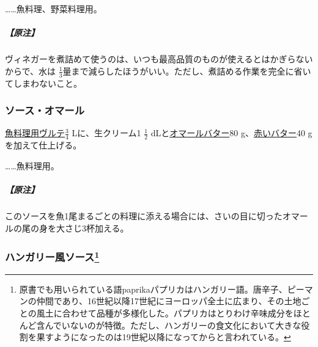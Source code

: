 \begin{recette}
\ldots{}\ldots{}魚料理、野菜料理用。

\hypertarget{nota-sauce-hollandaise}{%
\subparagraph{【原注】}\label{nota-sauce-hollandaise}}

ヴィネガーを煮詰めて使うのは、いつも最高品質のものが使えるとはかぎらないからで、水は
\(\frac{1}{3}\)量まで減らしたほうがいい。ただし、煮詰める作業を完全に省いてしまわないこと。

\atoaki{}

\hypertarget{sauce-homard}{%
\subsubsection{ソース・オマール}\label{sauce-homard}}


 

\protect\hyperlink{veloute-de-poisson}{魚料理用ヴルテ}\(\frac{3}{4}\)
Lに、生クリーム1 \(\frac{1}{2}\)
dLと\protect\hyperlink{beurre-de-homard}{オマールバター}80
g、\protect\hyperlink{beurre-colorant-rouge}{赤いバター}40
gを加えて仕上げる。

\ldots{}\ldots{}魚料理用。

\hypertarget{nota-sauce-homard}{%
\subparagraph{【原注】}\label{nota-sauce-homard}}

このソースを魚1尾まるごとの料理に添える場合には、さいの目に切ったオマールの尾の身を大さじ3杯加える。

\atoaki{}

\hypertarget{sauce-hongroise}{%
\subsubsection[ハンガリー風ソース]{\texorpdfstring{ハンガリー風ソース\footnote{原書でも用いられている語paprikaパプリカはハンガリー語。唐辛子、ピーマンの仲間であり、16世紀以降17世紀にヨーロッパ全土に広まり、その土地ごとの風土に合わせて品種が多様化した。パプリカはとりわけ辛味成分をほとんど含んでいないのが特徴。ただし、ハンガリーの食文化において大きな役割を果すようになったのは19世紀以降になってからと言われている。}}{ハンガリー風ソース}}\label{sauce-hongroise}}




\end{recette}
